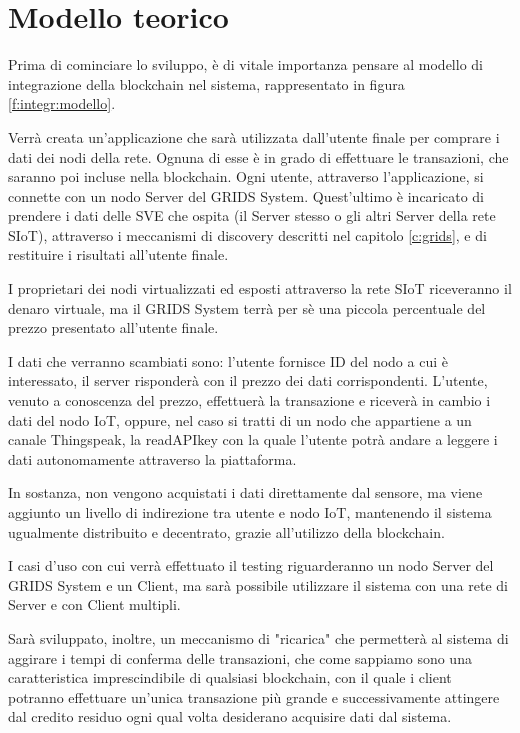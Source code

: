 \section{Modello teorico}
\label{c:integr:model}

Prima di cominciare lo sviluppo, è di vitale importanza pensare al modello di integrazione della blockchain nel sistema, rappresentato in figura \ref{f:integr:modello}. 


Verrà creata un'applicazione che sarà utilizzata dall'utente finale per comprare i dati dei nodi della rete. 
Ognuna di esse è in grado di effettuare le transazioni, che saranno poi incluse nella blockchain. Ogni utente, attraverso l'applicazione, si connette con un nodo Server del GRIDS System. Quest'ultimo è incaricato di prendere i dati delle SVE che ospita (il Server stesso o gli altri Server della rete SIoT), attraverso i meccanismi di discovery descritti nel capitolo \ref{c:grids}, e di restituire i risultati all'utente finale. 

I proprietari dei nodi virtualizzati ed esposti attraverso la rete SIoT riceveranno il denaro virtuale, ma il GRIDS System terrà per sè una piccola percentuale del prezzo presentato all'utente finale.

I dati che verranno scambiati sono: l'utente fornisce ID del nodo a cui è interessato, il server risponderà con il prezzo dei dati corrispondenti. L'utente, venuto a conoscenza del prezzo, effettuerà la transazione e riceverà in cambio i dati del nodo IoT, oppure, nel caso si tratti di un nodo che appartiene a un canale Thingspeak, la readAPIkey con la quale l'utente potrà andare a leggere i dati autonomamente attraverso la piattaforma.

In sostanza, non vengono acquistati i dati direttamente dal sensore, ma viene aggiunto un livello di indirezione tra utente e nodo IoT, mantenendo il sistema ugualmente distribuito e decentrato, grazie all'utilizzo della blockchain.

I casi d'uso con cui verrà effettuato il testing riguarderanno un nodo Server del GRIDS System e un Client, ma sarà possibile utilizzare il sistema con una rete di Server e con Client multipli.

Sarà sviluppato, inoltre, un meccanismo di "ricarica" che permetterà al sistema di aggirare i tempi di conferma delle transazioni, che come sappiamo sono una caratteristica imprescindibile di qualsiasi blockchain, con il quale i client potranno effettuare un'unica transazione più grande e successivamente attingere dal credito residuo ogni qual volta desiderano acquisire dati dal sistema.


